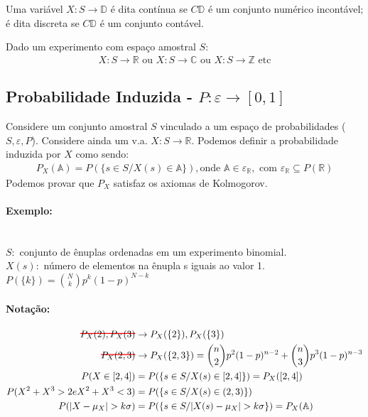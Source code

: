 \documentclass{article}
\newcommand\stk[2][black]{\setbox0=\hbox{$#2$}%
\rlap{\raisebox{.45\ht0}{\textcolor{#1}{\rule{\wd0}{1pt}}}}#2}
\begin{document}
Uma variável $X: S \rightarrow \mathbb{D}$ é dita contínua se $C \mathbb{D}$ é um conjunto numérico
incontável; é dita discreta se $C \mathbb{D}$ é um conjunto contável.

Dado um experimento com espaço amostral $S$:
\begin{align*}
    X: S \rightarrow \mathbb{R} \text{ ou } X: S \rightarrow \mathbb{C} \text{ ou } X: S
    \rightarrow \mathbb{Z} \text{ etc}
\end{align*}

\vspace{-0.75em}
\subsection{Probabilidade Induzida - $P: \varepsilon \rightarrow [0,1]$}
Considere um conjunto amostral $S$ vinculado a um espaço de probabilidades ($S, \varepsilon, P$).
Considere ainda um v.a. $X: S \rightarrow \mathbb{R}$. Podemos definir a probabilidade induzida por
$X$ como sendo:
\begin{align*}
    P_X(\mathbb{A}) = P(\{s \in S / X(s) \in \mathbb{A}\}), \text{onde } \mathbb{A} \in \varepsilon_{\mathbb{R}}, \text{ com } \varepsilon_{\mathbb{R}} \subseteq
    P(\mathbb{R})
\end{align*}
Podemos provar que $P_X$ satisfaz os axiomas de Kolmogorov.

\paragraph{Exemplo:}\mbox{}\\
$S:$ conjunto de ênuplas ordenadas em um experimento binomial.\\
$X(s):$ número de elementos na ênupla s iguais ao valor 1.\\
$P(\{k\}) = {N \choose k} p^k (1-p)^{N-k}$

\paragraph{Notação:}
\begin{align*}
\stk[red]{P_X(2), P_X(3)} &\rightarrow P_X(\{2\}), P_X(\{3\})\\
\stk[red]{P_X(2,3)} &\rightarrow P_X(\{2,3\}) = {n \choose 2}p^2(1-p)^{n-2} + {n \choose 3}p^3(1-p)^{n-3} \\
P(X \in [2,4]) &= P(\{s \in S / X(s) \in [2,4]\}) = P_X([2,4]) \\
P(X^2 + X^3 > 2 e X^2 + X^3 < 3) &= P(\{s \in S / X(s) \in (2,3)\}) \\
P(|X-\mu_X| > k \sigma) &= P(\{s \in S / |X(s) - \mu_X| > k \sigma \}) = P_X(\mathbb{A})
\end{align*}
\end{document}
